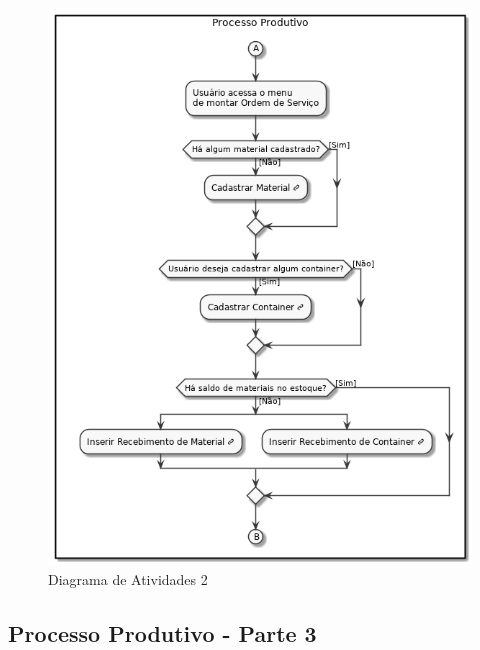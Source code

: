 \documentclass[rascunho,xindy,acronym,symbols]{fei}
\begin{document}
\begin{figure}[H]
    \centering
    \includegraphics[scale=0.6, width=400pt]{./Images/DA_Processo_Produvito2.png}
    \caption{Diagrama de Atividades 2}
    \label{fig:diag_atv2}
\end{figure}

\subsection{Processo Produtivo - Parte 3}
\end{document}
